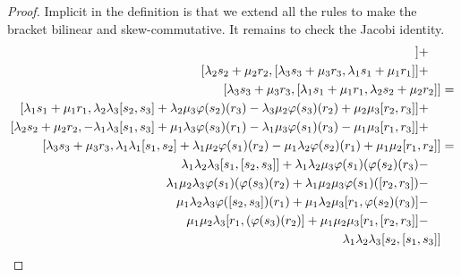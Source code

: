 \documentclass{amsart}
\begin{document}
\begin{proof} Implicit in the definition is that we extend all the
  rules to make the bracket bilinear and skew-commutative.  It remains to check the Jacobi
  identity.
\begin{align*}
[\lambda_{1}s_{1} + \mu_{1}r_{1}, [\lambda_{2}s_{2} + \mu_{2}r_{2},
    \lambda_{3}s_{3} + \mu_{3}r_{3}]] + \hspace{1 em} &\\
[\lambda_{2}s_{2} + \mu_{2}r_{2},
    [\lambda_{3}s_{3} + \mu_{3}r_{3}, \lambda_{1}s_{1} +
    \mu_{1}r_{1}]] + \hspace{1 em} &\\
[\lambda_{3}s_{3} + \mu_{3}r_{3}, [\lambda_{1}s_{1} +
    \mu_{1}r_{1}, \lambda_{2}s_{2}  + \mu_{2}r_{2}]]  & =\\
[\lambda_{1}s_{1} + \mu_{1}r_{1}, \lambda_{2}\lambda_{3}[s_{2},s_{3}]
    + \lambda_{2}\mu_{3}\varphi(s_{2})(r_{3}) -
    \lambda_{3}\mu_{2}\varphi(s_{3})(r_{2}) + \mu_{2}\mu_{3}[r_{2},
    r_{3}]] + \hspace{1 em} & \\ 
[\lambda_{2}s_{2} + \mu_{2}r_{2}, -\lambda_{1}\lambda_{3}[s_{1},s_{3}]
    + \mu_{1}\lambda_{3}\varphi(s_{3})(r_{1}) -
    \lambda_{1}\mu_{3}\varphi(s_{1})(r_{3}) - \mu_{1}\mu_{3}[r_{1},
    r_{3}]] + \hspace{1 em} & \\
[\lambda_{3}s_{3} + \mu_{3}r_{3}, \lambda_{1}\lambda_{1}[s_{1},s_{2}]
    + \lambda_{1}\mu_{2}\varphi(s_{1})(r_{2}) -
    \mu_{1}\lambda_{2}\varphi(s_{2})(r_{1}) + \mu_{1}\mu_{2}[r_{1},
    r_{2}]] & =\\
\lambda_{1}\lambda_{2}\lambda_{3}[s_{1},[s_{2},s_{3}]] 
+ \lambda_{1}\lambda_{2}\mu_{3}\varphi(s_{1})(\varphi(s_{2})(r_{3})
- \hspace{1 em} & \\
\lambda_{1}\mu_{2}\lambda_{3}\varphi(s_{1})(\varphi(s_{3})(r_{2})
+\lambda_{1}\mu_{2}\mu_{3}\varphi(s_{1})([r_{2},r_{3}]) - \hspace{1
    em} & \\
\mu_{1}\lambda_{2}\lambda_{3}\varphi([s_{2},s_{3}])(r_{1}) 
+ \mu_{1}\lambda_{2}\mu_{3}[r_{1},\varphi(s_{2})(r_{3})]
- \hspace{1 em} & \\
\mu_{1}\mu_{2}\lambda_{3}[r_{1},(\varphi(s_{3})(r_{2})]
+\mu_{1}\mu_{2}\mu_{3}[r_{1},[r_{2},r_{3}]] - \hspace{1
    em} & \\
\lambda_{1}\lambda_{2}\lambda_{3}[s_{2},[s_{1},s_{3}]] 

\end{align*}
\end{proof}
\end{document}
